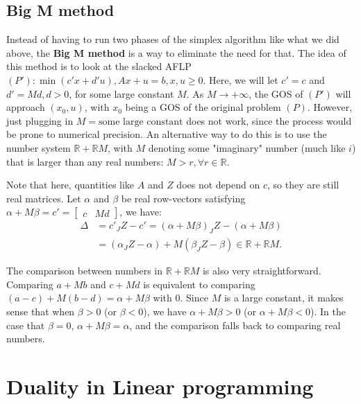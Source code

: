 \subsection{Big M method} %
\label{sub:Big M method}

Instead of having to run two phases of the simplex algorithm like what we did
above, the \textbf{Big M method} is a way to eliminate the need for that. The
idea of this method is to look at the slacked AFLP \( (P'): \min (c'x + d'u), Ax
+ u = b, x, u \ge 0\). Here, we will let \( c' = c \) and \( d' = Md, d > 0 \), for
some large constant \( M \). As \( M \to +\infty \), the GOS of \( (P') \) will
approach \( (x_{0}, u) \), with \( x_{0} \) being a GOS of the original problem
\( (P) \). However, just plugging in \( M = \text{some large constant} \) does
not work, since the process would be prone to numerical precision. An
alternative way to do this is to use the number system \( \mathbb{R} +
\mathbb{R}M \), with \( M \) denoting some "imaginary" number (much like \( i
\)) that  is larger than any real numbers: \( M > r, \forall  r \in \mathbb{R} \).

Note that here, quantities like \( A \) and \( Z \) does not depend on \( c \),
so they are still real matrices. Let \( \alpha \) and \( \beta \) be real
row-vectors satisfying \( \alpha + M\beta = c' = \begin{bmatrix} c & Md
\end{bmatrix}  \), we have:
\begin{align*}
  \Delta &= c'_{J}Z - c' = (\alpha+M\beta)_{J}Z - (\alpha + M\beta)\\
  &= (\alpha_{J}Z-\alpha) + M(\beta_{J}Z-\beta) \in \mathbb{R} + \mathbb{R}M
.\end{align*}

The comparison between numbers in \( \mathbb{R} + \mathbb{R}M \) is also very
straightforward. Comparing \( a + Mb \) and \( c + Md \) is equivalent to
comparing \( (a - c) + M(b - d) = \alpha + M\beta  \) with \( 0 \).
Since \( M \) is a large constant, it makes sense that when \( \beta > 0 \) (or
\( \beta < 0 \)), we
have \( \alpha + M\beta > 0 \) (or \( \alpha + M \beta < 0 \)).
In the case that \( \beta = 0 \), 
\( \alpha + M\beta = \alpha \), and the comparison falls back to comparing real
numbers.



\section{Duality in Linear programming} %
\label{sec:Duality in Linear programming}

